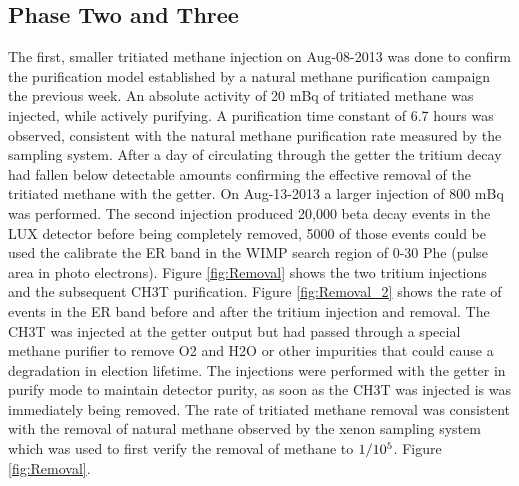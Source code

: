 \subsection{Phase Two and Three}

The first, smaller tritiated methane injection on Aug-08-2013 was done to confirm the purification model established by a natural methane purification campaign the previous week. An absolute activity of 20 mBq of tritiated methane was injected, while actively purifying. A purification time constant of 6.7 hours was observed, consistent with the natural methane purification rate measured by the sampling system. After a day of circulating through the getter the tritium decay had fallen below detectable amounts confirming the effective removal of the tritiated methane with the getter. On Aug-13-2013 a larger injection of 800 mBq was performed. The second injection produced 20,000 beta decay events in the LUX detector before being completely removed, 5000 of those events could be used the calibrate the ER band in the WIMP search region of 0-30 Phe (pulse area in photo electrons). 
Figure \ref{fig:Removal} shows the two tritium injections and the subsequent CH3T purification. Figure \ref{fig:Removal_2} shows the rate of events in the ER band before and after the tritium injection and removal. The CH3T was injected at the getter output but had passed through a special methane purifier to remove O2 and H2O or other impurities that could cause a degradation in election lifetime. The injections were performed with the getter in purify mode to maintain detector purity, as soon as the CH3T was injected is was immediately being removed.  The rate of tritiated methane removal was consistent with the removal of natural methane observed by the xenon sampling system which was used to first verify the removal of methane to $\rm 1/10^5$. Figure \ref{fig:Removal}.


